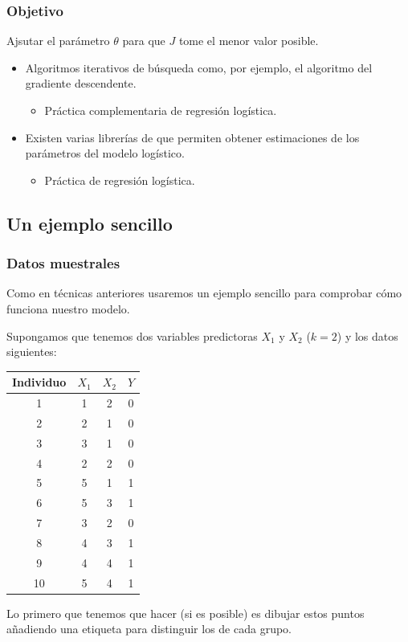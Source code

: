 \subsubsection{Objetivo}
Ajsutar el parámetro $\theta$ para que $J$ tome el menor valor posible.
\begin{itemize}
	\item {} Algoritmos iterativos de búsqueda como, por ejemplo, el algoritmo del gradiente descendente.
	\begin{itemize}
		\item Práctica complementaria de regresión logística.
	\end{itemize}
	\item Existen varias librerías de  que permiten obtener estimaciones de los parámetros del modelo logístico.
	\begin{itemize}
		\item Práctica de regresión logística.
	\end{itemize}
\end{itemize}
\subsection{Un ejemplo sencillo}
\subsubsection{Datos muestrales}
Como en técnicas anteriores usaremos un ejemplo sencillo para comprobar cómo funciona nuestro modelo.

Supongamos que tenemos dos variables predictoras $X_1$ y $X_2$ ($k = 2$) y los datos siguientes:
\begin{center}
\begin{tabular}{c|ccc}
	Individuo & $X_1$ & $X_2$ & $Y$ \\
	\hline
	1 & 1 & 2 & 0 \\
	2 & 2 & 1 & 0 \\
	3 & 3 & 1 & 0 \\
	4 & 2 & 2 & 0 \\
	5 & 5 & 1 & 1 \\
	6 & 5 & 3 & 1 \\
	7 & 3 & 2 & 0 \\
	8 & 4 & 3 & 1 \\
	9 & 4 & 4 & 1 \\
	10 & 5 & 4 & 1 \\
	\hline
\end{tabular}
\end{center}
Lo primero que tenemos que hacer (si es posible) es dibujar estos puntos añadiendo una etiqueta para distinguir los de cada grupo.

